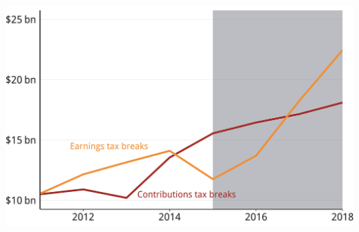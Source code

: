\documentclass[tikz]{standalone}\usepackage[]{graphicx}\usepackage[]{color}
\newenvironment{knitrout}{}{} %
\begin{document}
\begin{knitrout}
\color{fgcolor}
\includegraphics[width=11.000in,height=7.00in]{./Super-tax-targeting/b5-super-atlas/Figure2-5-1} 

\end{knitrout}
\end{document}
